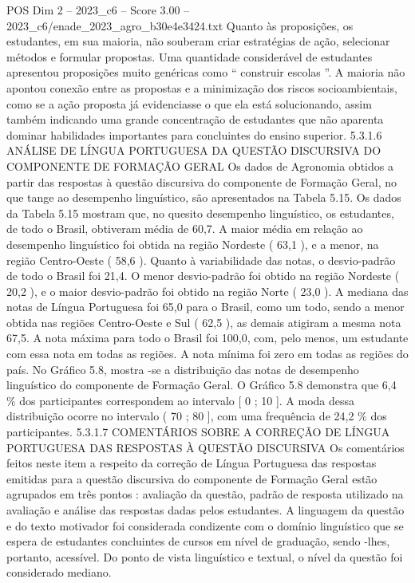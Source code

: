 \begin{textsample}{POS Dim 2 – 2023\_c6 – Score 3.00 – 2023\_c6/enade\_2023\_agro\_b30e4e3424.txt}
Quanto às proposições, os estudantes, em sua maioria, não souberam criar estratégias de ação, selecionar métodos e formular propostas.
Uma quantidade considerável de estudantes apresentou proposições muito genéricas como “ construir escolas ”.
A maioria não apontou conexão entre as propostas e a minimização dos riscos socioambientais, como se a ação proposta já evidenciasse o que ela está solucionando, assim também indicando uma grande concentração de estudantes que não aparenta dominar habilidades importantes para concluintes do ensino superior. 5.3.1.6 ANÁLISE DE LÍNGUA PORTUGUESA DA QUESTÃO DISCURSIVA DO COMPONENTE DE FORMAÇÃO GERAL Os dados de Agronomia obtidos a partir das respostas à questão discursiva do componente de Formação Geral, no que tange ao desempenho linguístico, são apresentados na Tabela 5.15.
Os dados da Tabela 5.15 mostram que, no quesito desempenho linguístico, os estudantes, de todo o Brasil, obtiveram média de 60,7.
A maior média em relação ao desempenho linguístico foi obtida na região Nordeste ( 63,1 ), e a menor, na região Centro-Oeste ( 58,6 ).
Quanto à variabilidade das notas, o desvio-padrão de todo o Brasil foi 21,4.
O menor desvio-padrão foi obtido na região Nordeste ( 20,2 ), e o maior desvio-padrão foi obtido na região Norte ( 23,0 ).
A mediana das notas de Língua Portuguesa foi 65,0 para o Brasil, como um todo, sendo a menor obtida nas regiões Centro-Oeste e Sul ( 62,5 ), as demais atigiram a mesma nota 67,5.
A nota máxima para todo o Brasil foi 100,0, com, pelo menos, um estudante com essa nota em todas as regiões.
A nota mínima foi zero em todas as regiões do país.
No Gráfico 5.8, mostra -se a distribuição das notas de desempenho linguístico do componente de Formação Geral.
O Gráfico 5.8 demonstra que 6,4 \% dos participantes correspondem ao intervalo [ 0 ; 10 ].
A moda dessa distribuição ocorre no intervalo ( 70 ; 80 ], com uma frequência de 24,2 \% dos participantes. 5.3.1.7 COMENTÁRIOS SOBRE A CORREÇÃO DE LÍNGUA PORTUGUESA DAS RESPOSTAS À QUESTÃO DISCURSIVA Os comentários feitos neste item a respeito da correção de Língua Portuguesa das respostas emitidas para a questão discursiva do componente de Formação Geral estão agrupados em três pontos : avaliação da questão, padrão de resposta utilizado na avaliação e análise das respostas dadas pelos estudantes.
A linguagem da questão e do texto motivador foi considerada condizente com o domínio linguístico que se espera de estudantes concluintes de cursos em nível de graduação, sendo -lhes, portanto, acessível.
Do ponto de vista linguístico e textual, o nível da questão foi considerado mediano.

\end{textsample}
